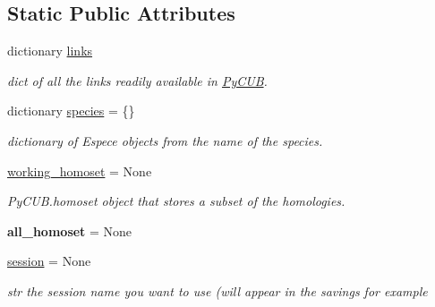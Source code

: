 \subsection*{Static Public Attributes}
\begin{DoxyCompactItemize}
\item 
dictionary \mbox{\hyperlink{class_py_c_u_b_1_1py_c_u_b_1_1_py_c_u_b_a5261b712d010de47f3f3166a97107a32}{links}}
\begin{DoxyCompactList}\small\item\em dict of all the links readily available in \mbox{\hyperlink{class_py_c_u_b_1_1py_c_u_b_1_1_py_c_u_b}{Py\+C\+UB}}. \end{DoxyCompactList}\item 
dictionary \mbox{\hyperlink{class_py_c_u_b_1_1py_c_u_b_1_1_py_c_u_b_a60cc232d3d52f88fe8a80244b3fcddc8}{species}} = \{\}
\begin{DoxyCompactList}\small\item\em dictionary of Espece objects from the name of the species. \end{DoxyCompactList}\item 
\mbox{\label{class_py_c_u_b_1_1py_c_u_b_1_1_py_c_u_b_ad3b3799416b15243c9027230dcd68482}} 
\mbox{\hyperlink{class_py_c_u_b_1_1py_c_u_b_1_1_py_c_u_b_ad3b3799416b15243c9027230dcd68482}{working\+\_\+homoset}} = None
\begin{DoxyCompactList}\small\item\em Py\+C\+U\+B.\+homoset object that stores a subset of the homologies. \end{DoxyCompactList}\item 
\mbox{\label{class_py_c_u_b_1_1py_c_u_b_1_1_py_c_u_b_a5e68f8b0897b4e75b69abd6f1ac1beed}} 
{\bfseries all\+\_\+homoset} = None
\item 
\mbox{\label{class_py_c_u_b_1_1py_c_u_b_1_1_py_c_u_b_a24fdc39b781fc1974625810704bd8140}} 
\mbox{\hyperlink{class_py_c_u_b_1_1py_c_u_b_1_1_py_c_u_b_a24fdc39b781fc1974625810704bd8140}{session}} = None
\begin{DoxyCompactList}\small\item\em str the session name you want to use (will appear in the savings for example \end{DoxyCompactList}\item 

\end{DoxyCompactItemize}
